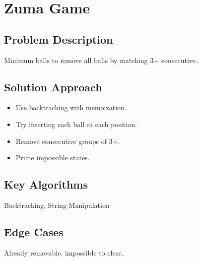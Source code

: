 \documentclass[10pt, a4paper]{article}
\begin{document}
\section{Zuma Game}
\subsection*{Problem Description}
Minimum balls to remove all balls by matching 3+ consecutive.

\subsection*{Solution Approach}
\begin{itemize}
    \item Use backtracking with memoization.
    \item Try inserting each ball at each position.
    \item Remove consecutive groups of 3+.
    \item Prune impossible states.
\end{itemize}

\subsection*{Key Algorithms}
Backtracking, String Manipulation

\subsection*{Edge Cases}
Already removable, impossible to clear.
\end{document}
